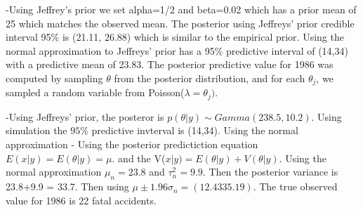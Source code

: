 \documentclass[
]{book}
\theoremstyle{definition}
\theoremstyle{definition}
\theoremstyle{definition}
\theoremstyle{definition}
\theoremstyle{remark}
\begin{document}
-Using Jeffrey's prior we set alpha=1/2 and beta=0.02 which has a prior mean of 25 which matches the observed mean. The posterior using Jeffreys' prior credible interval 95\(\%\) is (21.11, 26.88) which is similar to the empirical prior. Using the normal approximation to Jeffreys' prior has a 95\(\%\) predictive interval of (14,34) with a predictive mean of 23.83. The posterior predictive value for 1986 was computed by sampling \(\theta\) from the posterior distribution, and for each \(\theta_j\), we sampled a random variable from Poisson(\(\lambda=\theta_j)\).

-Using Jeffreys' prior, the posteror is \(p(\theta|y) \sim Gamma(238.5,10.2)\). Using simulation the \(95\%\) predictive invterval is (14,34). Using the normal approximation
- Using the posterior predictiction equation \(E(x|y) = E(\theta| y) = \mu\). and the V(\(x|y)= E(\theta| y)+ V(\theta | y)\). Using the normal approximation \(\mu_n = 23.8\) and \(\tau_n^2 = 9.9\). Then the posterior variance is 23.8+9.9 = 33.7. Then using \(\mu \pm 1.96\sigma_n = (12.43 35.19)\).
The true observed value for 1986 is 22 fatal accidents.
\end{document}

